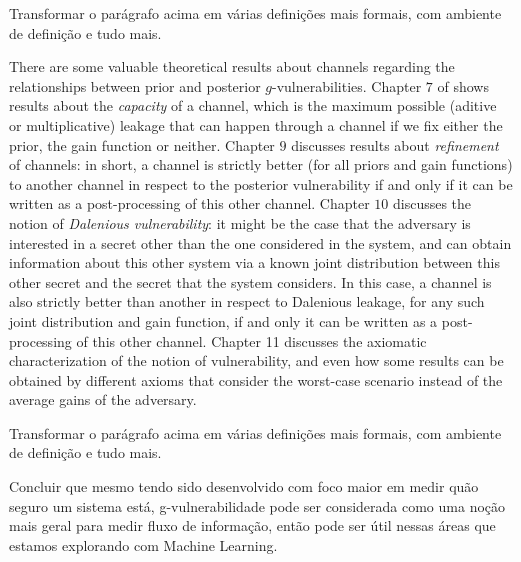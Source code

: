 {\color{red} Transformar o parágrafo acima em várias definições mais formais, com ambiente de definição e tudo mais.}

There are some valuable theoretical results about channels regarding the relationships between prior and posterior $g$-vulnerabilities. Chapter $7$ of \cite{QIF} shows results about the \emph{capacity} of a channel, which is the maximum possible (aditive or multiplicative) leakage that can happen through a channel if we fix either the prior, the gain function or neither. Chapter $9$ discusses results about \emph{refinement} of channels: in short, a channel is strictly better (for all priors and gain functions) to another channel in respect to the posterior vulnerability if and only if it can be written as a post-processing of this other channel. Chapter $10$ discusses the notion of \emph{Dalenious vulnerability}: it might be the case that the adversary is interested in a secret other than the one considered in the system, and can obtain information about this other system via a known joint distribution between this other secret and the secret that the system considers. In this case, a channel is also strictly better than another in respect to Dalenious leakage, for any such joint distribution and gain function, if and only it can be written as a post-processing of this other channel. Chapter 11 \cite{QIF} discusses the axiomatic characterization of the notion of vulnerability, and even how some results can be obtained by different axioms that consider the worst-case scenario instead of the average gains of the adversary.

{\color{red} Transformar o parágrafo acima em várias definições mais formais, com ambiente de definição e tudo mais.}

{\color{red} Concluir que mesmo tendo sido desenvolvido com foco maior em medir quão seguro um sistema está, g-vulnerabilidade pode ser considerada como uma noção mais geral para medir fluxo de informação, então pode ser útil nessas áreas que estamos explorando com Machine Learning.}
